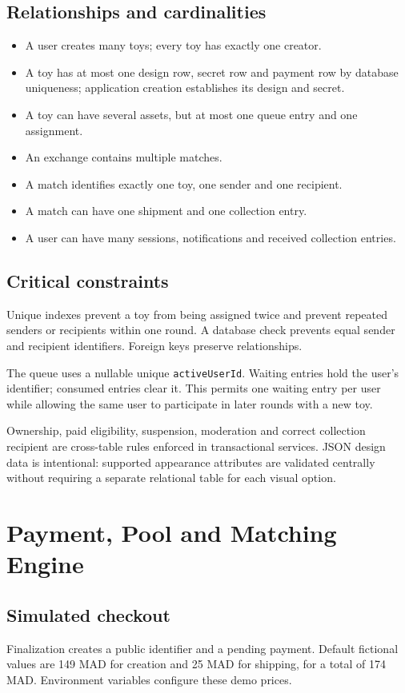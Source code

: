 \documentclass[11pt,a4paper]{article}
\begin{document}
\subsection{Relationships and cardinalities}
\begin{itemize}
  \item A user creates many toys; every toy has exactly one creator.
  \item A toy has at most one design row, secret row and payment row by database uniqueness; application creation establishes its design and secret.
  \item A toy can have several assets, but at most one queue entry and one assignment.
  \item An exchange contains multiple matches.
  \item A match identifies exactly one toy, one sender and one recipient.
  \item A match can have one shipment and one collection entry.
  \item A user can have many sessions, notifications and received collection entries.
\end{itemize}

\subsection{Critical constraints}
Unique indexes prevent a toy from being assigned twice and prevent repeated senders or recipients within one round. A database check prevents equal sender and recipient identifiers. Foreign keys preserve relationships.

The queue uses a nullable unique \texttt{activeUserId}. Waiting entries hold the user's identifier; consumed entries clear it. This permits one waiting entry per user while allowing the same user to participate in later rounds with a new toy.

Ownership, paid eligibility, suspension, moderation and correct collection recipient are cross-table rules enforced in transactional services. JSON design data is intentional: supported appearance attributes are validated centrally without requiring a separate relational table for each visual option.

\section{Payment, Pool and Matching Engine}

\subsection{Simulated checkout}
Finalization creates a public identifier and a pending payment. Default fictional values are 149 MAD for creation and 25 MAD for shipping, for a total of 174 MAD. Environment variables configure these demo prices.
\end{document}
